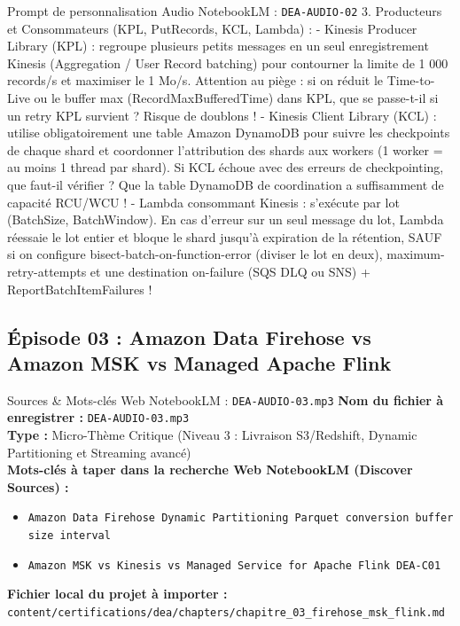\documentclass[11pt,a4paper]{article}
\begin{document}
\begin{promptbox}{Prompt de personnalisation Audio NotebookLM : \texttt{DEA-AUDIO-02}}
3. Producteurs et Consommateurs (KPL, PutRecords, KCL, Lambda) :
- Kinesis Producer Library (KPL) : regroupe plusieurs petits messages en un seul enregistrement Kinesis (Aggregation / User Record batching) pour contourner la limite de 1 000 records/s et maximiser le 1 Mo/s. Attention au piège : si on réduit le Time-to-Live ou le buffer max (RecordMaxBufferedTime) dans KPL, que se passe-t-il si un retry KPL survient ? Risque de doublons !
- Kinesis Client Library (KCL) : utilise obligatoirement une table Amazon DynamoDB pour suivre les checkpoints de chaque shard et coordonner l'attribution des shards aux workers (1 worker = au moins 1 thread par shard). Si KCL échoue avec des erreurs de checkpointing, que faut-il vérifier ? Que la table DynamoDB de coordination a suffisamment de capacité RCU/WCU !
- Lambda consommant Kinesis : s'exécute par lot (BatchSize, BatchWindow). En cas d'erreur sur un seul message du lot, Lambda réessaie le lot entier et bloque le shard jusqu'à expiration de la rétention, SAUF si on configure bisect-batch-on-function-error (diviser le lot en deux), maximum-retry-attempts et une destination on-failure (SQS DLQ ou SNS) + ReportBatchItemFailures !
\end{promptbox}

\subsection{Épisode 03 : Amazon Data Firehose vs Amazon MSK vs Managed Apache Flink}
\begin{sourcebox}{Sources \& Mots-clés Web NotebookLM : \texttt{DEA-AUDIO-03.mp3}}
\textbf{Nom du fichier à enregistrer :} \texttt{DEA-AUDIO-03.mp3}\\
\textbf{Type :} Micro-Thème Critique (Niveau 3 : Livraison S3/Redshift, Dynamic Partitioning et Streaming avancé)\\
\textbf{Mots-clés à taper dans la recherche Web NotebookLM (Discover Sources) :}
\begin{itemize}[noitemsep]
    \item \texttt{Amazon Data Firehose Dynamic Partitioning Parquet conversion buffer size interval}
    \item \texttt{Amazon MSK vs Kinesis vs Managed Service for Apache Flink DEA-C01}
\end{itemize}
\textbf{Fichier local du projet à importer :}
\texttt{content/certifications/dea/chapters/chapitre_03_firehose_msk_flink.md}
\end{sourcebox}
\end{document}
